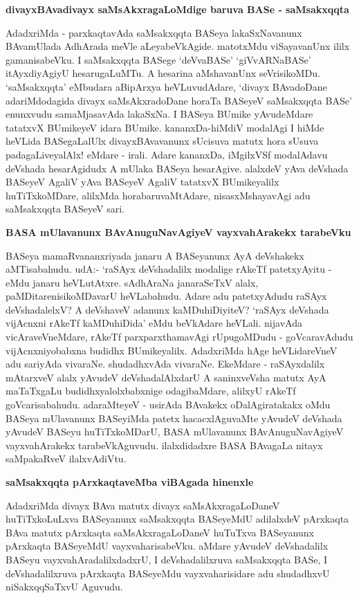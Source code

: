 \noindent
\textbf{divayxBAvadivayx saMsAkxragaLoMdige baruva BASe - saMsakxqqta}\label{page10}

AdadxriMda - parxkaqtavAda saMsakxqqta BASeya lakaSxNavanunx BAvamUlada AdhArada meVle aLeyabeVkAgide. matotxMdu viSayavanUnx ililx gamanisabeVku. I saMsakxqqta BASege `deVvaBASe' `giVvARNaBASe' itAyxdiyAgiyU hesarugaLuMTu. A hesarina aMshavanUnx seVrisikoMDu. `saMsakxqqta' eMbudara aBipArxya heVLuvudAdare, `divayx BAvadoDane adariMdodagida divayx saMsAkxradoDane horaTa BASeyeV saMsakxqqta BASe' enunxvudu samaMjasavAda lakaSxNa. I BASeya BUmike yAvudeMdare tatatxvX BUmikeyeV idara BUmike. kananxDa-hiMdiV modalAgi I hiMde heVLida BASegaLalUlx divayxBAvavanunx sUcisuva matutx hora sUsuva padagaLiveyalAlx! eMdare - irali. Adare kananxDa, iMgilxVSf modalAdavu deVshada hesarAgidudx A mUlaka BASeya hesarAgive. alalxdeV yAva deVshada BASeyeV AgaliV yAva BASeyeV AgaliV tatatxvX BUmikeyalilx huTiTxkoMDare, alilxMda horabaruvaMtAdare, nisasxMshayavAgi adu saMsakxqqta BASeyeV sari.

\noindent
\textbf{BASA mUlavanunx BAvAnuguNavAgiyeV vayxvahArakekx tarabeVku}\label{page10}

BASeya mamaRvananxriyada janaru A BASeyanunx AyA deVshakekx aMTisabahudu. udA:- `raSAyx deVshadalilx modalige rAkeTf patetxyAyitu - eMdu janaru heVLutAtxre. sAdhAraNa janaraSeTxV alalx, paMDitarenisikoMDavarU heVLabahudu. Adare adu patetxyAdudu raSAyx deVshadalelxV? A deVshaveV adanunx kaMDuhiDiyiteV? `raSAyx deVshada vijAcnxni rAkeTf kaMDuhiDida' eMdu beVkAdare heVLali. nijavAda vicAraveVneMdare, rAkeTf parxparxthamavAgi rUpugoMDudu - goVcaravAdudu vijAcnxniyobabxna budidhx BUmikeyalilx. AdadxriMda hAge heVLidareVneV adu sariyAda vivaraNe. shudadhxvAda vivaraNe. EkeMdare - raSAyxdalilx mAtarxveV alalx yAvudeV deVshadalAlxdarU A saninxveVsha matutx AyA maTaTxgaLu budidhxyalolxbabxnige odagibaMdare, alilxyU rAkeTf goVcarisabahudu. adaraMteyeV - usirAda BAvakekx oDalAgiratakakx oMdu BASeya mUlavanunx BASeyiMda patetx hacacxlAguvaMte yAvudeV deVshada yAvudeV BASeyu huTiTxkoMDarU, BASA mUlavanunx BAvAnuguNavAgiyeV vayxvahArakekx tarabeVkAguvudu. ilalxdidadxre BASA BAvagaLa nitayx saMpakaRveV ilalxvAdiVtu.

\noindent
\textbf{saMsakxqqta pArxkaqtaveMba viBAgada hinenxle}\label{page11}

AdadxriMda divayx BAva matutx divayx saMsAkxragaLoDaneV huTiTxkoLuLxva BASeyanunx saMsakxqqta BASeyeMdU adilalxdeV pArxkaqta BAva matutx pArxkaqta saMsAkxragaLoDaneV huTuTxva BASeyanunx pArxkaqta BASeyeMdU vayxvaharisabeVku. aMdare yAvudeV deVshadalilx BASeyu vayxvahAradalilxdadxrU, I deVshadalilxruva saMsakxqqta BASe, I deVshadalilxruva pArxkaqta BASeyeMdu vayxvaharisidare adu shudadhxvU niSakxqqSaTxvU Aguvudu.

